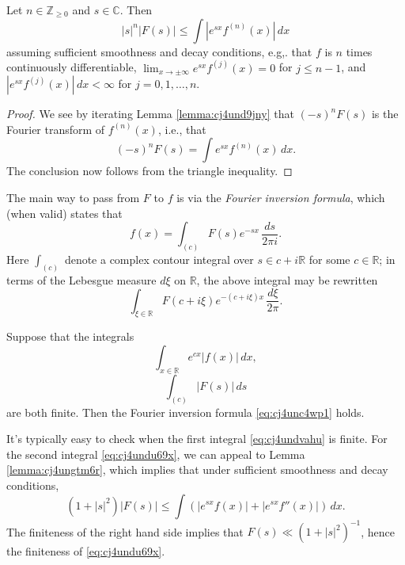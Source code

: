 \documentclass[reqno]{amsart} 
\begin{document}
\begin{lemma}\label{lemma:cj4ungtm6r}
  Let $n \in \mathbb{Z}_{\geq 0}$ and $s \in \mathbb{C}$.  Then
  \begin{equation*}
    \lvert s \rvert^n \lvert F(s) \rvert \leq \int \left\lvert e^{s x} f^{(n)}(x) \right\rvert \, d x
  \end{equation*}
  assuming sufficient smoothness and decay conditions, e.g,. that $f$ is $n$ times continuously differentiable, $\lim_{x \rightarrow \pm \infty }e^{s x } f ^{(j)}(x) = 0$ for $j \leq n-1$, and $\left\lvert e^{s x } f^{(j)}(x) \right\rvert \,d x< \infty $ for $j =0, 1,\dotsc, n$.
\end{lemma}
\begin{proof}
  We see by iterating Lemma \ref{lemma:cj4und9jny} that $(-s)^n F(s)$ is the Fourier transform of $f^{(n)}(x)$, i.e., that
  \begin{equation*}
    (-s)^n F(s) = \int e^{s x } f^{(n)} (x) \, d x.
  \end{equation*}
  The conclusion now follows from the triangle inequality.
\end{proof}


The main way to pass from $F$ to $f$ is via the \emph{Fourier inversion formula}, which (when valid) states that
\begin{equation}\label{eq:cj4unc4wp1}
  f (x) = \int_{(c)} F(s) e^{- s x} \, \frac{d s }{2 \pi i}.
\end{equation}
Here $\int_{(c)}$ denote a complex contour integral over $s \in c + i \mathbb{R}$ for some $c \in \mathbb{R}$; in terms of the Lebesgue measure $d \xi$ on $\mathbb{R}$, the above integral may be rewritten
\begin{equation*}
  \int_{\xi \in \mathbb{R}} F(c + i \xi ) e^{- (c + i \xi) x} \, \frac{d \xi  }{2 \pi}.
\end{equation*}
\begin{theorem}
  Suppose that the integrals
  \begin{equation}\label{eq:cj4undvahu}
    \int_{x \in \mathbb{R} } e^{c x} \lvert f(x) \rvert \, d x,
  \end{equation}
  \begin{equation}\label{eq:cj4undu69x}
    \int_{(c)} \lvert F(s) \rvert \, d s
  \end{equation}
  are both finite.  Then the Fourier inversion formula \eqref{eq:cj4unc4wp1} holds.
\end{theorem}
It's typically easy to check when the first integral \eqref{eq:cj4undvahu} is finite.  For the second integral \eqref{eq:cj4undu69x}, we can appeal to Lemma \ref{lemma:cj4ungtm6r}, which implies that under sufficient smoothness and decay conditions,
\begin{equation*}
(1 + |s|^2) \lvert F(s) \rvert \leq \int \left( \lvert e^{s x } f(x) \rvert + \lvert e^{s x } f''(x) \rvert \right) \, d x.
\end{equation*}
The finiteness of the right hand side implies that $F(s) \ll (1 + |s|^2)^{-1}$, hence the finiteness of \eqref{eq:cj4undu69x}.
\end{document}
